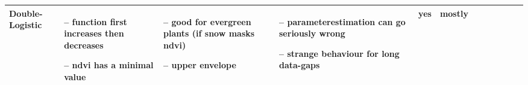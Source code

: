 \begin{table}[!ht]
\begin{tabular}{p{1.6cm}p{3.3cm}p{3.3cm}p{3.3cm}p{0.4cm}p{0.4cm}p{3cm}p{3cm}p{3cm}p{3cm}p{3cm}p{3cm}|}

		Double-Logistic                                                                                                                                              &
		\begin{cptitemize} \item[--]  function first increases then decreases \item[--]  ndvi has a minimal value                            \end{cptitemize}        &
		\begin{cptitemize} \item[--]  good for evergreen plants (if snow masks ndvi) \item[--] upper envelope                                \end{cptitemize}        &
		\begin{cptitemize} \item[--]  parameterestimation can go seriously wrong \item[--]  strange behaviour for long data-gaps             \end{cptitemize}        &
		yes                                                                                                                                                          &
		mostly                                                                                                                                                         \\ \hline%


\end{tabular}
\end{table}
